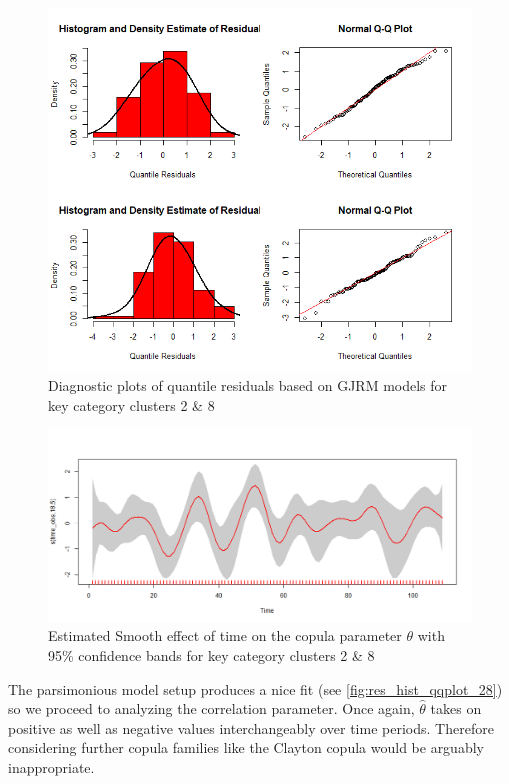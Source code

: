\begin{figure}[H]
\centering
  \includegraphics[width=0.95\linewidth]{figures/res_hist_qqplot_28.png}
  \caption{Diagnostic plots of quantile residuals based on \ac{GJRM} models for key category clusters 2 \& 8}
  \label{fig:res_hist_qqplot_28}
\end{figure}


\begin{figure}[H]
\centering
  \includegraphics[width=0.95\linewidth]{figures/time_effect_on_theta_28.png}
  \caption{Estimated Smooth effect of time on the copula parameter $\theta$ with 95\% confidence bands for key category clusters 2 \& 8}
  \label{fig:time_effect_on_theta_28}
\end{figure}


The parsimonious model setup produces a nice fit (see \autoref{fig:res_hist_qqplot_28}) so we proceed to analyzing the correlation parameter. Once again, $\hat{\theta}$ takes on positive as well as negative values interchangeably over time periods. Therefore considering further copula families like the Clayton copula would be arguably inappropriate.
\\



